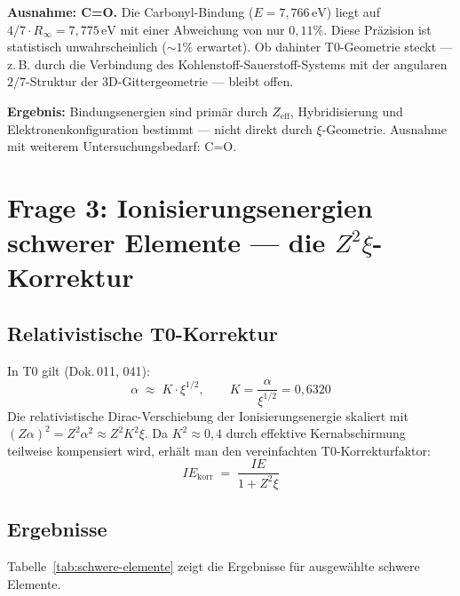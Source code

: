\textbf{Ausnahme: C=O.}
Die Carbonyl-Bindung ($E = 7{,}766\,\mathrm{eV}$) liegt auf
$4/7 \cdot R_\infty = 7{,}775\,\mathrm{eV}$ mit einer Abweichung von
nur $0{,}11\%$. Diese Präzision ist statistisch unwahrscheinlich ($\sim1\%$
erwartet). Ob dahinter T0-Geometrie steckt — z.\,B. durch die Verbindung
des Kohlenstoff-Sauerstoff-Systems mit der angularen $2/7$-Struktur
der 3D-Gittergeometrie — bleibt offen.

\textbf{Ergebnis:} Bindungsenergien sind primär durch $Z_\mathrm{eff}$,
Hybridisierung und Elektronenkonfiguration bestimmt — nicht direkt durch
$\xi$-Geometrie. Ausnahme mit weiterem Untersuchungsbedarf: C=O.

\section{Frage 3: Ionisierungsenergien schwerer Elemente — die \texorpdfstring{$Z^2\xi$}{Z²ξ}-Korrektur}
\label{sec:schwere-elemente}

\subsection{Relativistische T0-Korrektur}
\label{subsec:rel-korrektur}

In T0 gilt (Dok.\,011, 041):
\begin{equation}
  \alpha \;\approx\; K \cdot \xi^{1/2}, \qquad K = \frac{\alpha}{\xi^{1/2}} = 0{,}6320
\end{equation}
Die relativistische Dirac-Verschiebung der Ionisierungsenergie skaliert mit
$(Z\alpha)^2 = Z^2 \alpha^2 \approx Z^2 K^2 \xi$.
Da $K^2 \approx 0{,}4$ durch effektive Kernabschirmung teilweise kompensiert
wird, erhält man den vereinfachten T0-Korrekturfaktor:
\begin{equation}
  \boxed{IE_\mathrm{korr} \;=\; \frac{IE}{1 + Z^2 \xi}}
  \label{eq:IE-korr}
\end{equation}

\subsection{Ergebnisse}
\label{subsec:ergebnisse-schwer}

Tabelle~\ref{tab:schwere-elemente} zeigt die Ergebnisse für ausgewählte
schwere Elemente.

